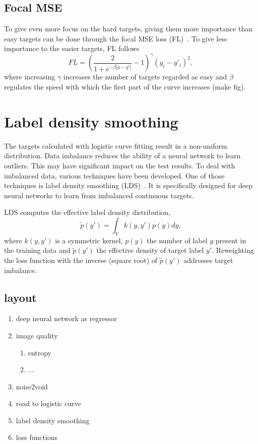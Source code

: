 \subsection{Focal MSE}
To give even more focus on the hard targets, giving them more importance than easy targets can be done through the focal MSE loss (FL)~\cite{Lu2022}.
To give less importance to the easier targets, FL follows
\begin{equation}
    FL = \left(\frac{2}{1 + e^{-\beta |y - y'|}} - 1 \right)^\gamma (y_i - y'_i)^2,
\end{equation}
where increasing $\gamma$ increases the number of targets regarded as easy and $\beta$ regulates the speed with which the first part of the curve increases (make fig).


\section{Label density smoothing}
The targets calculated with logistic curve fitting result in a non-uniform distribution.
Data imbalance reduces the ability of a neural network to learn outliers.
This may have significant impact on the test results.
To deal with imbalanced data, various techniques have been developed.
One of those techniques is label density smoothing (LDS)~\cite{yang2021delving}.
It is specifically designed for deep neural networks to learn from imbalanced continuous targets.

\newcommand{\edtl}{$\tilde{p}(y')$ }
LDS computes the effective label density distribution,
\begin{equation}
    \tilde{p}(y') = \int_Y k(y, y')p(y)dy,
\end{equation}
where $k(y,y')$ is a symmetric kernel, $p(y)$ the number of label $y$ present in the training data and \edtl the effective density of target label $y'$.
Reweighting the loss function with the inverse (square root) of \edtl addresses target imbalance.

\subsection*{layout}
\begin{enumerate}
    \item deep neural network as regressor
    \item image quality
          \begin{enumerate}
              \item entropy
              \item ...
          \end{enumerate}
    \item noise2void
    \item road to logistic curve
    \item label density smoothing
    \item loss functions
\end{enumerate}